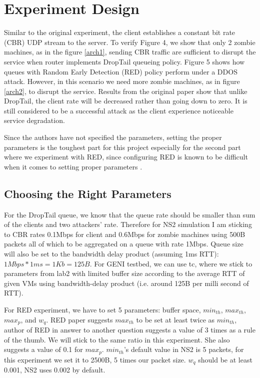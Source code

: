 \documentclass[12pt,twocolumn]{article}
\begin{document}
\section {Experiment Design}

Similar to the original experiment, the client establishes a constant bit rate (CBR) UDP stream to the server.
To verify Figure 4, we show that only 2 zombie machines, as in the figure \ref{arch1}, sending CBR traffic are sufficient to disrupt the service when router implements DropTail queueing policy.
Figure 5 shows how queues with Random Early Detection (RED) policy perform under a DDOS attack.
However, in this scenario we need more zombie machines, as in figure \ref{arch2}, to disrupt the service.
Results from the original paper show that unlike DropTail, the client rate will be decreased rather than going down to zero.
It is still considered to be a successful attack as the client experience noticeable service degradation.

Since the authors have not specified the parameters, setting the proper parameters is the toughest part for this project especially for the second part where we experiment with RED, since configuring RED is known to be difficult when it comes to setting proper parameters \cite{floyd1993random}.

\subsection{Choosing the Right Parameters}

For the DropTail queue, we know that the queue rate should be smaller than sum of the clients and two attackers’ rate.
Therefore for NS2 simulation I am sticking to CBR rates 0.1Mbps for client and 0.6Mbps for zombie machines using 500B packets all of which to be aggregated on a queue with rate 1Mbps.
Queue size will also be set to the bandwidth delay product (assuming 1ms RTT): $1Mbps*1ms=1Kb=125B$.
For GENI testbed, we can use tc, where we stick to parameters from lab2 with limited buffer size according to the average RTT of given VMs using bandwidth-delay product (i.e. around 125B per milli second of RTT).

For RED experiment, we have to set 5 parameters: buffer space, $min_{th}$, $max_{th}$, $max_p$, and $w_q$.
RED paper suggests $max_{th}$ to be set at least twice as $min_{th}$, author of RED in answer to another question \cite{red} suggests a value of 3 times as a rule of the thumb.
We will stick to the same ratio in this experiment.
She also suggests a value of 0.1 for $max_p$.
$min_{th}$’s default value in NS2 is 5 packets, for this experiment we set it to 2500B, 5 times our packet size.
$w_q$ should be at least 0.001, NS2 uses 0.002 by default.
\end{document}
